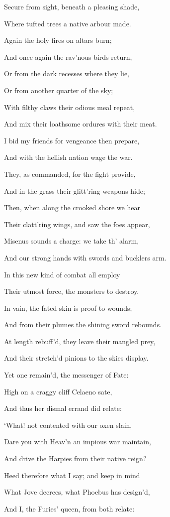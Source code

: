 Secure from sight, beneath a pleasing shade,

Where tufted trees a native arbour made.

Again the holy fires on altars burn;

And once again the rav’nous birds return,

Or from the dark recesses where they lie,

Or from another quarter of the sky;

With filthy claws their odious meal repeat,

And mix their loathsome ordures with their meat.

I bid my friends for vengeance then prepare,

And with the hellish nation wage the war.

They, as commanded, for the fight provide,

And in the grass their glitt’ring weapons hide;

Then, when along the crooked shore we hear

Their clatt’ring wings, and saw the foes appear,

Misenus sounds a charge: we take th’ alarm,

And our strong hands with swords and bucklers arm.

In this new kind of combat all employ

Their utmost force, the monsters to destroy.

In vain, the fated skin is proof to wounds;

And from their plumes the shining sword rebounds.

At length rebuff’d, they leave their mangled prey,

And their stretch’d pinions to the skies display.

Yet one remain’d, the messenger of Fate:

High on a craggy cliff Celaeno sate,

And thus her dismal errand did relate:

‘What! not contented with our oxen slain,

Dare you with Heav’n an impious war maintain,

And drive the Harpies from their native reign?

Heed therefore what I say; and keep in mind

What Jove decrees, what Phoebus has design’d,

And I, the Furies’ queen, from both relate:

